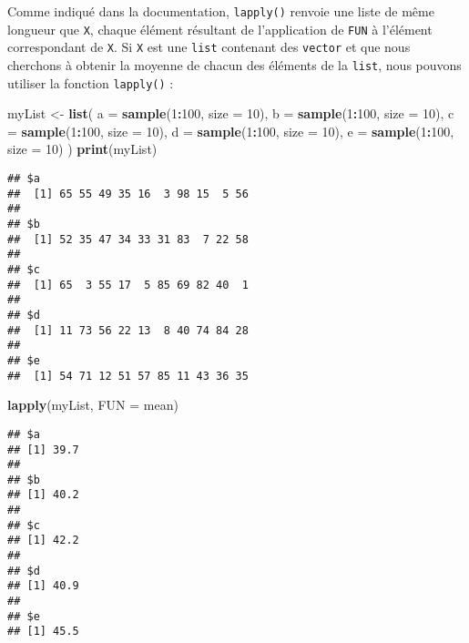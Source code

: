 \documentclass[]{book}
\newenvironment{Shaded}{\begin{snugshade}}{\end{snugshade}}
\newcommand{\KeywordTok}[1]{\textcolor[rgb]{0.13,0.29,0.53}{\textbf{#1}}}
\newcommand{\DataTypeTok}[1]{\textcolor[rgb]{0.13,0.29,0.53}{#1}}
\newcommand{\DecValTok}[1]{\textcolor[rgb]{0.00,0.00,0.81}{#1}}
\newcommand{\StringTok}[1]{\textcolor[rgb]{0.31,0.60,0.02}{#1}}
\newcommand{\OperatorTok}[1]{\textcolor[rgb]{0.81,0.36,0.00}{\textbf{#1}}}
\newcommand{\NormalTok}[1]{#1}
\theoremstyle{definition}
\theoremstyle{definition}
\theoremstyle{definition}
\theoremstyle{remark}
\begin{document}
Comme indiqué dans la documentation, \texttt{lapply()} renvoie une liste
de même longueur que \texttt{X}, chaque élément résultant de
l'application de \texttt{FUN} à l'élément correspondant de \texttt{X}.
Si \texttt{X} est une \texttt{list} contenant des \texttt{vector} et que
nous cherchons à obtenir la moyenne de chacun des éléments de la
\texttt{list}, nous pouvons utiliser la fonction \texttt{lapply()} :

\begin{Shaded}
\begin{Highlighting}[]
\NormalTok{myList <-}\StringTok{ }\KeywordTok{list}\NormalTok{(}
  \DataTypeTok{a =} \KeywordTok{sample}\NormalTok{(}\DecValTok{1}\OperatorTok{:}\DecValTok{100}\NormalTok{, }\DataTypeTok{size =} \DecValTok{10}\NormalTok{), }
  \DataTypeTok{b =} \KeywordTok{sample}\NormalTok{(}\DecValTok{1}\OperatorTok{:}\DecValTok{100}\NormalTok{, }\DataTypeTok{size =} \DecValTok{10}\NormalTok{), }
  \DataTypeTok{c =} \KeywordTok{sample}\NormalTok{(}\DecValTok{1}\OperatorTok{:}\DecValTok{100}\NormalTok{, }\DataTypeTok{size =} \DecValTok{10}\NormalTok{), }
  \DataTypeTok{d =} \KeywordTok{sample}\NormalTok{(}\DecValTok{1}\OperatorTok{:}\DecValTok{100}\NormalTok{, }\DataTypeTok{size =} \DecValTok{10}\NormalTok{), }
  \DataTypeTok{e =} \KeywordTok{sample}\NormalTok{(}\DecValTok{1}\OperatorTok{:}\DecValTok{100}\NormalTok{, }\DataTypeTok{size =} \DecValTok{10}\NormalTok{)}
\NormalTok{)}
\KeywordTok{print}\NormalTok{(myList)}
\end{Highlighting}
\end{Shaded}

\begin{verbatim}
## $a
##  [1] 65 55 49 35 16  3 98 15  5 56
## 
## $b
##  [1] 52 35 47 34 33 31 83  7 22 58
## 
## $c
##  [1] 65  3 55 17  5 85 69 82 40  1
## 
## $d
##  [1] 11 73 56 22 13  8 40 74 84 28
## 
## $e
##  [1] 54 71 12 51 57 85 11 43 36 35
\end{verbatim}

\begin{Shaded}
\begin{Highlighting}[]
\KeywordTok{lapply}\NormalTok{(myList, }\DataTypeTok{FUN =}\NormalTok{ mean)}
\end{Highlighting}
\end{Shaded}

\begin{verbatim}
## $a
## [1] 39.7
## 
## $b
## [1] 40.2
## 
## $c
## [1] 42.2
## 
## $d
## [1] 40.9
## 
## $e
## [1] 45.5
\end{verbatim}
\end{document}

